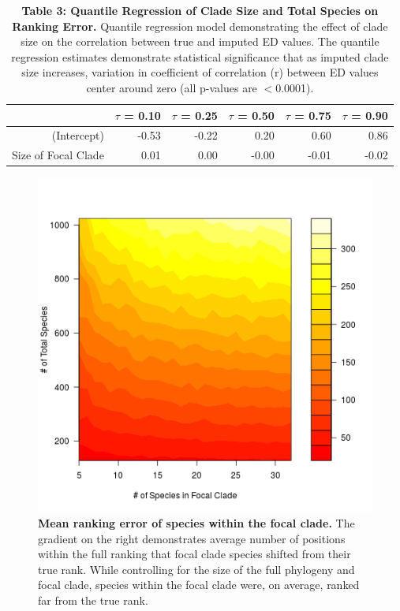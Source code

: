 \documentclass[12pt,english]{article}
\begin{document}
\begin{table}[ht]
  \centering
  \begin{tabular}{rrrrrr}
    \hline
    & $\tau$ = 0.10 & $\tau$ = 0.25 & $\tau$ = 0.50 & $\tau$ = 0.75 & $\tau$ = 0.90 \\
    \hline
  (Intercept) & -0.53 & -0.22 & 0.20 & 0.60 & 0.86 \\
    Size of Focal Clade & 0.01 & 0.00 & -0.00 & -0.01 & -0.02 \\
    \hline
    \hline
  \end{tabular}
  \caption*{\textbf{Table 3: Quantile Regression of Clade Size and Total Species
  on Ranking Error.} Quantile regression model demonstrating the effect of clade
  size on the correlation between true and imputed ED values. The quantile
  regression estimates demonstrate statistical significance that as imputed
  clade size increases, variation in coefficient of correlation (r) between ED
  values center around zero (all p-values are $<$0.0001).}
\end{table}


\begin{figure}[!ht]
  \center
  \includegraphics[width=.5\textwidth]{rankingError.png}
  \caption{\textbf{Mean ranking error of species within the focal clade.} The 
  gradient on the right demonstrates average number of positions within the 
  full ranking that focal clade species shifted from their true rank.
  While controlling for the size of the full phylogeny and focal clade, species 
  within the focal clade were, on average, ranked far from the true rank. }
  \label{rankingError}
\end{figure}
\end{document}

